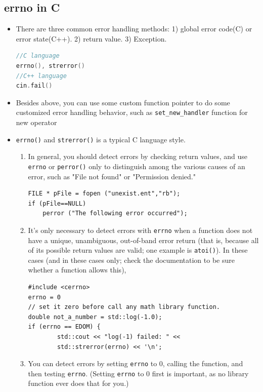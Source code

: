 \documentclass[a4paper,11pt,twoside]{book}
\begin{document}
\subsection{errno in C}
\begin{itemize}
	
	\item There are three common error handling methods: 1) global error code(C) or error state(C++). 2) return value. 3) Exception.
\begin{lstlisting}[frame=single, language=c++]
//C language
errno(), strerror()
//C++ language
cin.fail()
\end{lstlisting}


	\item Besides above, you can use some custom function pointer to do some customized error handling behavior, such as \texttt{set\_new\_handler} function for new operator
	
	\item \texttt{errno()} and \texttt{strerror()} is a typical C language style.
	
	\begin{enumerate}
		\item In general, you should detect errors by checking return values, and use \texttt{errno} or \texttt{perror()} only to distinguish among the various causes of an error, such as "File not found" or "Permission denied."
		
\begin{lstlisting}[numbers=none]
FILE * pFile = fopen ("unexist.ent","rb");
if (pFile==NULL)
	perror ("The following error occurred");
\end{lstlisting}
		
		\item It's only necessary to detect errors with \texttt{errno} when a function does not have a unique, unambiguous, out-of-band error return (that is, because all of its possible return values are valid; one example is \texttt{atoi()}). In these cases (and in these cases only; check the documentation to be sure whether a function allows this),
\begin{lstlisting}[numbers=none]
#include <cerrno>
errno = 0
// set it zero before call any math library function.
double not_a_number = std::log(-1.0);
if (errno == EDOM) {
		std::cout << "log(-1) failed: " <<
		std::strerror(errno) << '\n';
\end{lstlisting}
		\item You can detect errors by setting \texttt{errno} to 0, calling the function, and then testing \texttt{errno}. (Setting \texttt{errno} to 0 first is important, as no library function ever does that for you.)
	\end{enumerate}
	

\end{itemize}
\end{document}
